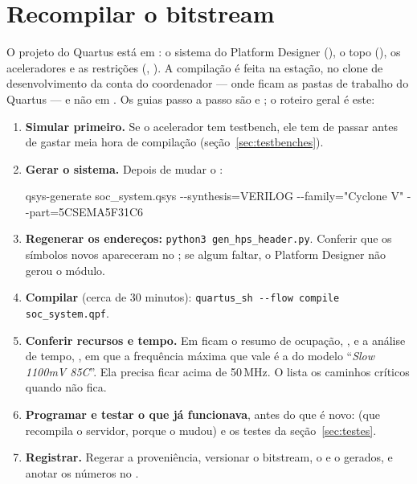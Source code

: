 \section{Recompilar o bitstream}
\label{sec:recompilar}

O projeto do Quartus está em : o sistema do Platform Designer
(), o topo (), os aceleradores e as
restrições (, ). A compilação é
feita na estação, no clone de desenvolvimento da conta do coordenador ---
onde ficam as pastas de trabalho do Quartus --- e não em . Os
guias passo a passo são  e
; o roteiro geral é este:

\begin{enumerate}
  \item \textbf{Simular primeiro.} Se o acelerador tem testbench, ele tem de
    passar antes de gastar meia hora de compilação
    (seção~\ref{sec:testbenches}).
  \item \textbf{Gerar o sistema.} Depois de mudar o :
    \begin{center}\ttfamily\small
    qsys-generate soc\_system.qsys -{}-synthesis=VERILOG -{}-family="Cyclone V" -{}-part=5CSEMA5F31C6
    \end{center}
  \item \textbf{Regenerar os endereços:} \texttt{python3 gen\_hps\_header.py}.
    Conferir que os símbolos novos apareceram no ; se algum
    faltar, o Platform Designer não gerou o módulo.
  \item \textbf{Compilar} (cerca de 30 minutos):
    \texttt{quartus\_sh -{}-flow compile soc\_system.qpf}.
  \item \textbf{Conferir recursos e tempo.} Em  ficam o
    resumo de ocupação, , e a análise de tempo,
    , em que a frequência máxima que vale é a do
    modelo ``\emph{Slow 1100mV 85C}''. Ela precisa
    ficar acima de 50\,MHz. O  lista os caminhos
    críticos quando não fica.
  \item \textbf{Programar e testar o que já funcionava}, antes do que é novo:
     (que recompila o servidor, porque o 
    mudou) e os testes da seção~\ref{sec:testes}.
  \item \textbf{Registrar.} Regerar a proveniência, versionar o bitstream, o
     e o  gerados, e anotar os números no
    .
\end{enumerate}

